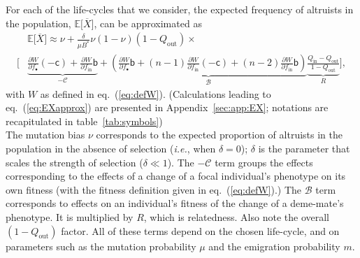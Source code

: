 \documentclass[11pt, letterpaper]{article}
\renewcommand{\eqref}[1]{\textup{{\normalfont eq.~(\ref{#1}}\normalfont)}}
\newcommand{\ie}{\textit{i.e.}}
\newcommand{\derivn}[2]{\frac{\partial #1}{\partial #2}}
\newcommand{\Esp}[1]{\mathbb{E}\big[ #1\big]}%
\newcommand{\appname}[0]{Appendix}
\newcommand{\bb}{\mathsf{b}}
\newcommand{\cc}{\mathsf{c}}
\newcommand{\mutbias}{\nu}
\newcommand{\inn}{\textrm{in}}
\newcommand{\out}{\textrm{out}}
\newcommand{\focal}{\bullet}
\newcommand{\Qout}{Q_{\out}}
\newcommand{\selstr}{\delta}
\begin{document}
For each of the life-cycles that we consider, the expected frequency of altruists in the population, $\Esp{\overline{X}}$, can be approximated as
\begin{equation}\label{eq:EXapprox}
\begin{split}
& \Esp{\overline{X}} \approx \mutbias + 
\frac{\selstr}{\mu B^*}  \mutbias (1-\mutbias) (1 - Q_{\out}) \times \\
 \Bigg[ &\underbrace{ \derivn{W}{f_{\focal}} (-\cc) + \derivn{W}{f_{\inn}} \bb}_{-\mathcal{C}} + \underbrace{ \left( \derivn{W}{f_{\focal}} \bb + (n-1) \derivn{W}{f_{\inn}} (-\cc) + (n-2) \derivn{W}{f_{\inn}} \bb \right) }_{\mathcal{B}} \underbrace{\frac{Q_{\inn} - Q_{\out}}{1 - Q_{\out}}}_{R} \Bigg],
\end{split}
\end{equation}
%
with $W$ as defined in \eqref{eq:defW}. (Calculations leading to \eqref{eq:EXapprox} are presented in  \appname~\ref{sec:app:EX}; notations are recapitulated in table~\ref{tab:symbols})\\
The mutation bias $\mutbias$ corresponds to the expected proportion of altruists in the population in the absence of selection (\ie, when $\selstr = 0$); $\selstr$ is the parameter that scales the strength of selection ($\selstr \ll 1$). The $-\mathcal{C}$ term groups the effects corresponding to the effects of a change of a focal individual's phenotype on its own fitness (with the fitness definition given in \eqref{eq:defW}.) The $\mathcal{B}$ term corresponds to effects on an individual's fitness of the change of a deme-mate's phenotype. It is multiplied by $R$, which is relatedness. Also note the overall $(1-\Qout)$ factor. All of these terms depend on the chosen life-cycle, and on parameters such as the mutation probability $\mu$ and the emigration probability $m$. 
\end{document}
